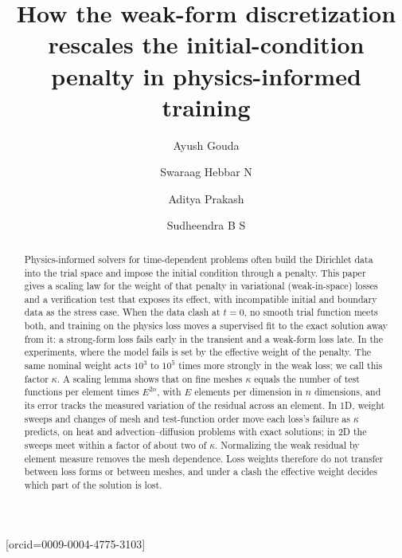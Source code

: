 \documentclass[a4paper,fleqn]{cas-sc}
\begin{document}
\let\WriteBookmarks\relax
\def\floatpagepagefraction{1}
\def\textpagefraction{.001}


\title [mode = title]{How the weak-form discretization rescales the initial-condition penalty in physics-informed training}

\author[1]{Ayush Gouda}[orcid=0009-0004-4775-3103]
\cormark[1]

\author[1]{Swaraag {Hebbar N}}

\author[1]{Aditya Prakash}

\author[1]{Sudheendra {B S}}



\begin{abstract}
Physics-informed solvers for time-dependent problems often build the Dirichlet data into the trial space and impose the
initial condition through a penalty. This paper gives a scaling law for the weight of that penalty in variational
(weak-in-space) losses and a verification test that exposes its effect, with incompatible initial and boundary data as
the stress case. When the data clash at $t=0$, no smooth trial function meets both, and training on the physics loss
moves a supervised fit to the exact solution away from it: a strong-form loss fails early in the transient and a
weak-form loss late. In the experiments, where the model fails is set by the effective weight of the penalty. The same nominal weight acts
$10^3$ to $10^5$ times more strongly in the weak loss; we call this factor $\kappa$. A scaling lemma shows that on fine meshes $\kappa$
equals the number of test functions per element times $E^{2n}$, with $E$ elements per dimension in $n$ dimensions, and its
error tracks the measured variation of the residual across an element. In 1D, weight sweeps and changes of mesh
and test-function order move each loss's failure as $\kappa$ predicts, on heat and advection--diffusion problems with
exact solutions; in 2D the sweeps meet within a factor of about two of $\kappa$. Normalizing the weak residual by element measure removes the mesh dependence. Loss weights therefore do
not transfer between loss forms or between meshes, and under a clash the effective weight decides which part of the
solution is lost.
\end{abstract}
\end{document}
